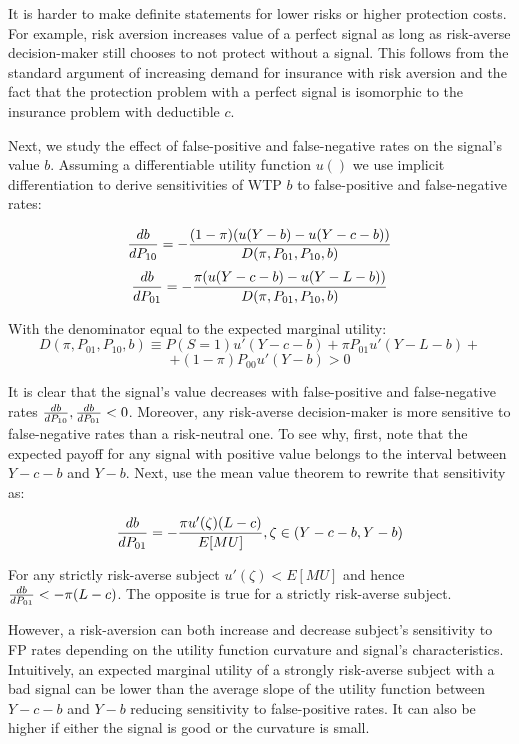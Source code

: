 \documentclass[12pt,a4paper]{article}
\begin{document}
It is harder to make definite statements for lower risks or higher protection costs. For example, risk aversion increases value of a perfect signal as long as risk-averse decision-maker still chooses to not protect without a signal. This follows from the standard argument of increasing demand for insurance with risk aversion and the fact that the protection problem with a perfect signal is isomorphic to the insurance problem with deductible $c$. 

Next, we study the effect of false-positive and false-negative rates on the signal's value $b$. Assuming a differentiable utility function $u()$ we use implicit differentiation to derive sensitivities of WTP $b$ to false-positive and false-negative rates:

$${db\over dP_{10}}=-{(1-\pi)(u(Y-b)-u(Y-c-b))\over D(\pi, P_{01}, P_{10}, b)}$$
$${db\over dP_{01}}=-{\pi(u(Y-c-b)-u(Y-L-b))\over D(\pi, P_{01}, P_{10}, b)}$$

With the denominator equal to the expected marginal utility:
$$D(\pi, P_{01}, P_{10}, b)\equiv P(S=1)u'(Y-c-b)+\pi P_{01}u'(Y-L-b)+$$
$$+(1-\pi)P_{00}u'(Y-b)>0$$

It is clear that the signal's value decreases with false-positive and false-negative rates ${db\over dP_{10}},{db\over dP_{01}}<0$. Moreover, any risk-averse decision-maker is more sensitive to false-negative rates than a risk-neutral one. To see why, first, note that the expected payoff for any signal with positive value belongs to the interval between $Y-c-b$ and $Y-b$. Next, use the mean value theorem to rewrite that sensitivity as:

$${db\over dP_{01}}=-{\pi u'(\zeta)(L-c)\over E[MU]},\zeta \in \left(Y-c -b, Y-b\right)$$

For any strictly risk-averse subject $u'(\zeta)<E[MU]$  and hence ${db\over dP_{01}}<-\pi(L-c)$. The opposite is true for a strictly risk-averse subject.

However, a risk-aversion can both increase and decrease subject's sensitivity to FP rates depending on the utility function curvature and signal's characteristics. Intuitively, an expected marginal utility of a strongly risk-averse subject with a bad signal can be lower than the average slope of the utility function between $Y-c-b$ and $Y-b$ reducing sensitivity to false-positive rates. It can also be higher if either the signal is good or the curvature is small. 

\newpage
\singlespacing
\small


\end{document}
